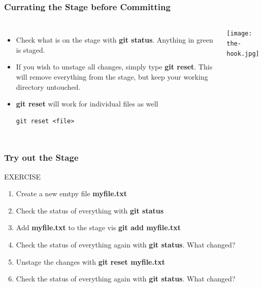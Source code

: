 \documentclass{beamer}
\begin{document}
\begin{frame}[fragile]
\frametitle{Currating the Stage before Committing}
\begin{columns}
\begin{itemize}
\item Check what is on the stage with \textbf{git status}. Anything in \textcolor{dkgreen}{green} is staged.
\item If you wish to unstage all changes, simply type \textbf{git reset}. This will remove everything from the stage, but keep your working directory untouched. 
\item \textbf{git reset} will work for individual files as well
        \begin{lstlisting}
git reset <file>
        \end{lstlisting}
\end{itemize}
\texttt{[image: the-hook.jpg]}
\end{columns}
\end{frame}
\begin{frame}[fragile]
\frametitle{Try out the Stage}
	\begin{block}{EXERCISE}
		\begin{enumerate}
		\item Create a new emtpy file \textbf{myfile.txt}
		\item Check the status of everything with \textbf{git status}
		\item Add \textbf{myfile.txt} to the stage vis \textbf{git add myfile.txt}
		\item Check the status of everything again with \textbf{git status}. What changed?
		\item Unstage the changes with \textbf{git reset myfile.txt}
		\item Check the status of everything again with \textbf{git status}. What changed?
		\end{enumerate}
	\end{block}

\end{frame}
\end{document}

